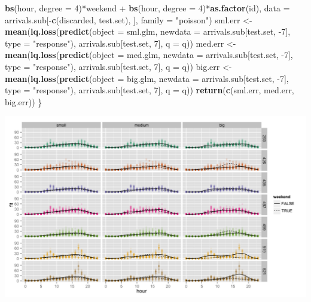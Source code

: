 \documentclass[]{article}
\newenvironment{Shaded}{\begin{snugshade}}{\end{snugshade}}
\newcommand{\KeywordTok}[1]{\textcolor[rgb]{0.13,0.29,0.53}{\textbf{{#1}}}}
\newcommand{\DataTypeTok}[1]{\textcolor[rgb]{0.13,0.29,0.53}{{#1}}}
\newcommand{\DecValTok}[1]{\textcolor[rgb]{0.00,0.00,0.81}{{#1}}}
\newcommand{\StringTok}[1]{\textcolor[rgb]{0.31,0.60,0.02}{{#1}}}
\newcommand{\NormalTok}[1]{{#1}}
\begin{document}
\begin{Shaded}
\begin{Highlighting}[]
\StringTok{                   }\KeywordTok{bs}\NormalTok{(hour, }\DataTypeTok{degree =} \DecValTok{4}\NormalTok{)*weekend}
                   \NormalTok{+}\StringTok{ }\KeywordTok{bs}\NormalTok{(hour, }\DataTypeTok{degree =} \DecValTok{4}\NormalTok{)*}\KeywordTok{as.factor}\NormalTok{(id),}
                   \DataTypeTok{data =} \NormalTok{arrivals.sub[-}\KeywordTok{c}\NormalTok{(discarded, test.set), ],}
                   \DataTypeTok{family =} \StringTok{"poisson"}\NormalTok{)}
    \NormalTok{sml.err <-}\StringTok{ }\KeywordTok{mean}\NormalTok{(}\KeywordTok{lq.loss}\NormalTok{(}\KeywordTok{predict}\NormalTok{(}\DataTypeTok{object =} \NormalTok{sml.glm,}
                                    \DataTypeTok{newdata =} \NormalTok{arrivals.sub[test.set, -}\DecValTok{7}\NormalTok{],}
                                    \DataTypeTok{type =} \StringTok{"response"}\NormalTok{),}
                            \NormalTok{arrivals.sub[test.set, }\DecValTok{7}\NormalTok{],}
                            \DataTypeTok{q =} \NormalTok{q))}
    \NormalTok{med.err <-}\StringTok{ }\KeywordTok{mean}\NormalTok{(}\KeywordTok{lq.loss}\NormalTok{(}\KeywordTok{predict}\NormalTok{(}\DataTypeTok{object =} \NormalTok{med.glm,}
                                    \DataTypeTok{newdata =} \NormalTok{arrivals.sub[test.set, -}\DecValTok{7}\NormalTok{],}
                                    \DataTypeTok{type =} \StringTok{"response"}\NormalTok{),}
                            \NormalTok{arrivals.sub[test.set, }\DecValTok{7}\NormalTok{],}
                            \DataTypeTok{q =} \NormalTok{q))}
    \NormalTok{big.err <-}\StringTok{ }\KeywordTok{mean}\NormalTok{(}\KeywordTok{lq.loss}\NormalTok{(}\KeywordTok{predict}\NormalTok{(}\DataTypeTok{object =} \NormalTok{big.glm,}
                                    \DataTypeTok{newdata =} \NormalTok{arrivals.sub[test.set, -}\DecValTok{7}\NormalTok{],}
                                    \DataTypeTok{type =} \StringTok{"response"}\NormalTok{),}
                            \NormalTok{arrivals.sub[test.set, }\DecValTok{7}\NormalTok{],}
                            \DataTypeTok{q =} \NormalTok{q))}
    \KeywordTok{return}\NormalTok{(}\KeywordTok{c}\NormalTok{(sml.err, med.err, big.err))}
\NormalTok{\}}
\end{Highlighting}
\end{Shaded}

\includegraphics{../fig/fit_all.png}
\end{document}
